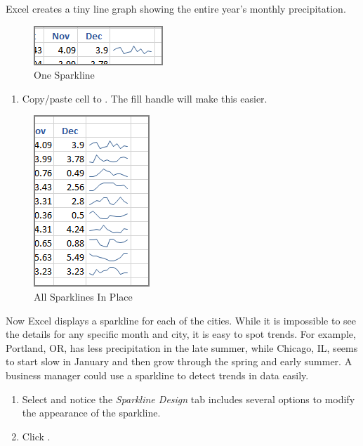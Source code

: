 Excel creates a tiny line graph showing the entire year's monthly precipitation. 

\begin{figure}[H]
	\centering
	\includegraphics[width=\maxwidth{.50\linewidth}]{gfx/ch08_fig03}
	\caption{One Sparkline}
	\label{08:fig03}
\end{figure}

\begin{enumbox}
	\begin{enumerate}
		\item Copy/paste cell  to . The fill handle will make this easier. 
	\end{enumerate}
\end{enumbox}

\begin{figure}[H]
	\centering
	\includegraphics[width=\maxwidth{.50\linewidth}]{gfx/ch08_fig04}
	\caption{All Sparklines In Place}
	\label{08:fig04}
\end{figure}

Now Excel displays a sparkline for each of the cities. While it is impossible to see the details for any specific month and city, it is easy to spot trends. For example, Portland, OR, has less precipitation in the late summer, while Chicago, IL, seems to start slow in January and then grow through the spring and early summer. A business manager could use a sparkline to detect trends in data easily.

\begin{enumbox}
	\begin{enumerate}
		\item Select  and notice the \textit{Sparkline Design} tab includes several options to modify the appearance of the sparkline. 
		\item Click .
	\end{enumerate}
\end{enumbox}
	
